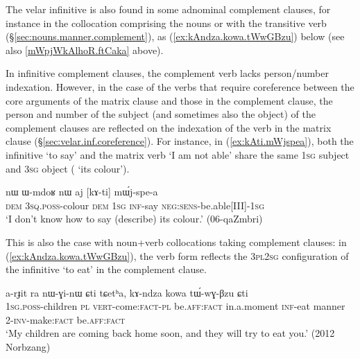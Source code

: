 The velar infinitive is also found in some adnominal complement clauses, for instance in the collocation comprising the nouns  or  with the transitive verb  (§\ref{sec:nouns.manner.complement}), as (\ref{ex:kAndza.kowa.tWwGBzu}) below (see also  \ref{mWpjWkAlhoR.ftCaka} above). 

In infinitive complement clauses, the complement verb lacks person/number indexation. However, in the case of the verbs that require coreference between the core arguments of the matrix clause and those in the complement clause, the person and number of the subject (and sometimes also the object) of the complement clauses are reflected on the indexation of the verb in the matrix clause (§\ref{sec:velar.inf.coreference}). For instance, in (\ref{ex:kAti.mWjspea}), both the infinitive  `to say' and the matrix verb  `I am not able' share the same \textsc{1sg} subject and \textsc{3sg} object ( `its colour').  

\begin{exe}
\ex \label{ex:kAti.mWjspea}
\gll nɯ ɯ-mdoʁ nɯ aj [kɤ-ti] mɯ́j-spe-a \\
\textsc{dem} \textsc{3sq}.\textsc{poss}-colour \textsc{dem} \textsc{1sg} \textsc{inf}-say \textsc{neg}:\textsc{sens}-be.able[III]-\textsc{1sg} \\
\glt `I don't know how to say (describe) its colour.' (06-qaZmbri)
  \end{exe} 
  
 This is also the case with noun+verb collocations taking complement clauses: in (\ref{ex:kAndza.kowa.tWwGBzu}), the verb form  reflects the \textsc{3pl}\fl{}\textsc{2sg} configuration of the infinitive  `to eat' in the complement clause. 
  
  \begin{exe}
\ex \label{ex:kAndza.kowa.tWwGBzu}
\gll   a-rɟit ra nɯ-ɣi-nɯ ɕti tɕetʰa, kɤ-ndza kowa tɯ́-wɣ-βzu ɕti \\
 \textsc{1sg}.\textsc{poss}-children \textsc{pl} \textsc{vert}-come:\textsc{fact}-\textsc{pl} be.\textsc{aff}:\textsc{fact} in.a.moment \textsc{inf}-eat manner 2-\textsc{inv}-make:\textsc{fact}  be.\textsc{aff}:\textsc{fact} \\
 \glt `My children are coming back home soon, and they will try to eat you.' (2012 Norbzang) 
 \end{exe} 
 

